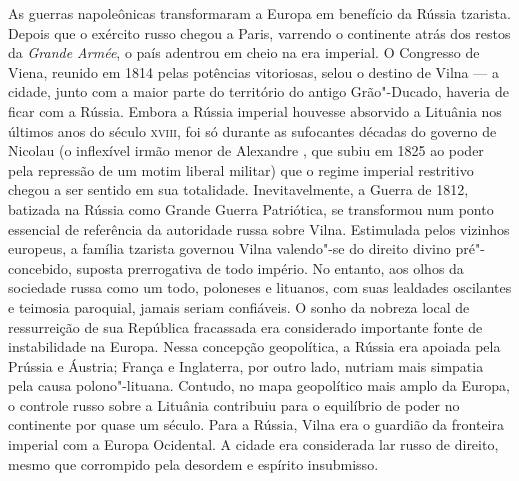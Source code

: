 \begin{epigraphs} 
\end{epigraphs}


As guerras napoleônicas transformaram a Europa em benefício da Rússia
tzarista. Depois que o exército russo chegou a Paris, varrendo o
continente atrás dos restos da \textit{Grande Armée}, o país adentrou em
cheio na era imperial. 
O Congresso de Viena, reunido em 1814 pelas
potências vitoriosas, selou o destino de Vilna --- a cidade, junto com
a maior parte do território do antigo Grão"-Ducado, haveria de ficar com a
Rússia. Embora a Rússia imperial houvesse absorvido a Lituânia nos
últimos anos do século \textsc{xviii}, foi só durante as sufocantes décadas do
governo de Nicolau  (o inflexível irmão menor de Alexandre , que subiu
em 1825 ao poder pela repressão de um motim liberal militar) que o
regime imperial restritivo chegou a ser sentido em sua totalidade.
Inevitavelmente, a Guerra de 1812, batizada na Rússia como Grande Guerra
Patriótica, se transformou num ponto essencial de referência da
autoridade russa sobre Vilna. Estimulada pelos vizinhos europeus, a
família tzarista governou Vilna valendo"-se do direito divino
pré"-concebido, suposta prerrogativa de todo império. No entanto, aos
olhos da sociedade russa como um todo, poloneses e lituanos, com suas
lealdades oscilantes e teimosia paroquial, jamais seriam confiáveis. O
sonho da nobreza local de ressurreição de sua República fracassada era
considerado importante fonte de instabilidade na Europa. Nessa concepção
geopolítica, a Rússia era apoiada pela Prússia e Áustria; França e
Inglaterra, por outro lado, nutriam mais simpatia pela causa
polono"-lituana. Contudo, no mapa geopolítico mais amplo da Europa, o
controle russo sobre a Lituânia contribuiu para o equilíbrio de poder no
continente por quase um século. Para a Rússia, Vilna era o guardião da
fronteira imperial com a Europa Ocidental. A cidade era considerada lar
russo de direito, mesmo que corrompido pela desordem e espírito
insubmisso.

